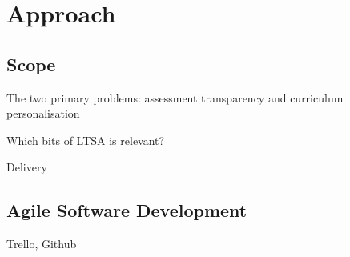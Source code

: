 \chapter{Approach}

\section{Scope}

The two primary problems: assessment transparency and curriculum personalisation

Which bits of LTSA is relevant?

Delivery

\section{Agile Software Development}

Trello, Github


